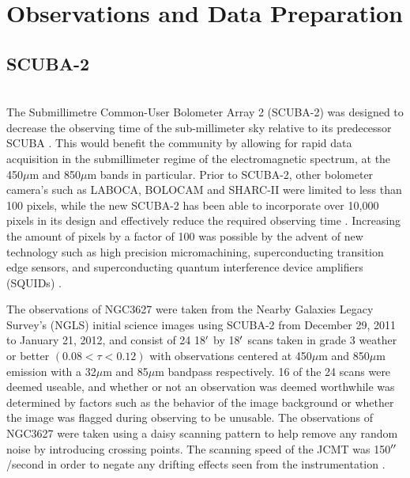 \chapter{Observations and Data Preparation}\label{observations}

\section{SCUBA-2} \\
The Submillimetre Common-User Bolometer Array 2 (SCUBA-2) was designed to decrease the observing time of the sub-millimeter sky relative to its predecessor SCUBA \citep{holland2013}.  This would benefit the community by allowing for rapid data acquisition in the submillimeter regime of the electromagnetic spectrum, at the 450$\mu$m and 850$\mu$m bands in particular.  Prior to SCUBA-2, other bolometer camera's such as LABOCA, BOLOCAM and SHARC-II were limited to less than 100 pixels, while the new SCUBA-2 has been able to incorporate over 10,000 pixels in its design and effectively reduce the required observing time \citep{chapin2013}.  Increasing the amount of pixels by a factor of 100 was possible by the advent of new technology such as high precision micromachining, superconducting transition edge sensors, and superconducting quantum interference device amplifiers (SQUIDs) \citep{holland2013}.

The observations of NGC3627 were taken from the Nearby Galaxies Legacy Survey's (NGLS) initial science images using SCUBA-2 from December 29, 2011  to January 21, 2012, and consist of 24 18$\mbox{$^\prime$}$ by 18$\mbox{$^\prime$}$ scans taken in grade 3 weather or better $(0.08 < \tau <0.12)$ with observations centered at 450$\mu$m and 850$\mu$m emission with a 32$\mu$m and 85$\mu$m bandpass respectively.  16 of the 24 scans were deemed useable, and whether or not an observation was deemed worthwhile was determined by factors such as the behavior of the image background or whether the image was flagged during observing to be unusable.  The observations of NGC3627 were taken using a daisy scanning pattern  to help remove any random noise by introducing crossing points.  The scanning speed of the JCMT was 150$\mbox{$^{\prime\prime}$}$/second in order to negate any drifting effects seen from the instrumentation \citep{chapin2013}.

